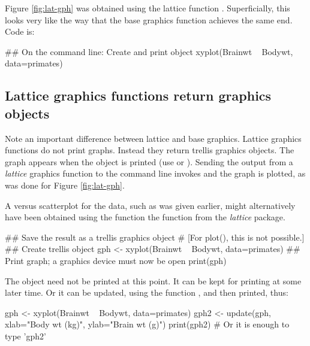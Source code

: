 Figure \ref{fig:lat-gph} was obtained using the lattice function
. Superficially, this looks very like the way that
the base graphics function  achieves the same end.
Code is:

\begin{Schunk}
\begin{Sinput}
## On the command line: Create and print object
xyplot(Brainwt ~ Bodywt, data=primates)
\end{Sinput}
\end{Schunk}

\subsection*{Lattice graphics functions return graphics objects}
Note an important difference between lattice and base graphics.
Lattice graphics functions do not print graphs. Instead they return
trellis graphics objects.  The graph appears when the object is
printed (use  or ).  Sending the output
from a {\em lattice} graphics function to the command line invokes
 and the graph is plotted, as was done for Figure
\ref{fig:lat-gph}.

A  versus  scatterplot for the
 data, such as was given earlier, might alternatively
have been obtained using the function the function 
from the \textit{lattice} package.

\begin{Schunk}
\begin{Sinput}
## Save the result as a trellis graphics object
# [For plot(), this is not possible.]
## Create trellis object
gph <- xyplot(Brainwt ~ Bodywt, data=primates)
## Print graph; a graphics device must now be open
print(gph)
\end{Sinput}
\end{Schunk}
The object  need not be printed at this point.  It can be
kept for printing at some later time.  Or it can be updated, using the
function , and then printed, thus:
\begin{Schunk}
\begin{Sinput}
gph <- xyplot(Brainwt ~ Bodywt, data=primates)
gph2 <- update(gph, xlab="Body wt (kg)",
               ylab="Brain wt (g)")
print(gph2)  # Or it is enough to type 'gph2'
\end{Sinput}
\end{Schunk}

